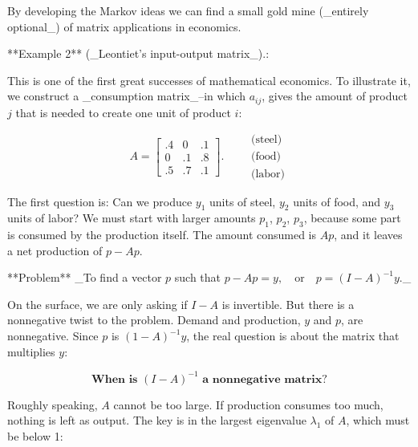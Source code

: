 By developing the Markov ideas we can find a small gold mine (_entirely optional_) of matrix applications in economics.

**Example 2** (_Leontiet's input-output matrix_).:

This is one of the first great successes of mathematical economics. To illustrate it, we construct a _consumption matrix_--in which \(a_{ij}\), gives the amount of product \(j\) that is needed to create one unit of product \(i\):

\[A=\begin{bmatrix}.4&0&.1\\ 0&.1&.8\\ .5&.7&.1\end{bmatrix}.\qquad\begin{array}{ll}\text{(steel)}\\ \text{(food)}\\ \text{(labor)}\end{array}\]

The first question is: Can we produce \(y_{1}\) units of steel, \(y_{2}\) units of food, and \(y_{3}\) units of labor? We must start with larger amounts \(p_{1}\), \(p_{2}\), \(p_{3}\), because some part is consumed by the production itself. The amount consumed is \(Ap\), and it leaves a net production of \(p-Ap\).

**Problem** _To find a vector \(p\) such that \(p-Ap=y,\quad\text{or}\quad p=(I-A)^{-1}y\)._

On the surface, we are only asking if \(I-A\) is invertible. But there is a nonnegative twist to the problem. Demand and production, \(y\) and \(p\), are nonnegative. Since \(p\) is \((1-A)^{-1}y\), the real question is about the matrix that multiplies \(y\):

\[\textbf{When is }(I-A)^{-1}\textbf{ a nonnegative matrix}?\]

Roughly speaking, \(A\) cannot be too large. If production consumes too much, nothing is left as output. The key is in the largest eigenvalue \(\lambda_{1}\) of \(A\), which must be below 1: